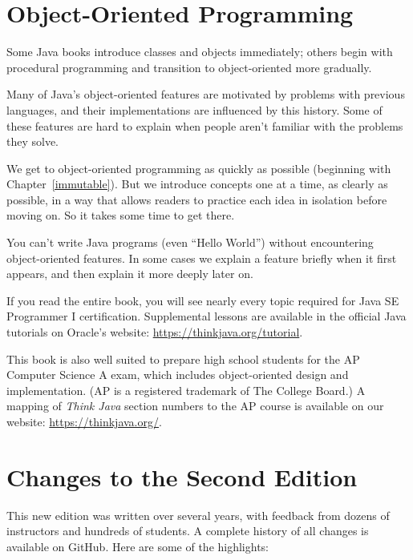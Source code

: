 \section*{Object-Oriented Programming}

Some Java books introduce classes and objects immediately; others begin with procedural programming and transition to object-oriented more gradually.

Many of Java's object-oriented features are motivated by problems with previous languages, and their implementations are influenced by this history.
Some of these features are hard to explain when people aren't familiar with the problems they solve.

We get to object-oriented programming as quickly as possible (beginning with Chapter~\ref{immutable}).
But we introduce concepts one at a time, as clearly as possible, in a way that allows readers to practice each idea in isolation before moving on.
So it takes some time to get there.

You can't write Java programs (even ``Hello World'') without encountering object-oriented features.
In some cases we explain a feature briefly when it first appears, and then explain it more deeply later on.

If you read the entire book, you will see nearly every topic required for Java SE Programmer I certification.
Supplemental lessons are available in the official Java tutorials on Oracle's website: \url{https://thinkjava.org/tutorial}.

This book is also well suited to prepare high school students for the AP Computer Science A exam, which includes object-oriented design and implementation.
(AP is a registered trademark of The College Board.)
A mapping of {\it Think Java} section numbers to the AP course is available on our website: \url{https://thinkjava.org/}.


\section*{Changes to the Second Edition}

This new edition was written over several years, with feedback from dozens of instructors and hundreds of students.
A complete history of all changes is available on GitHub.
Here are some of the highlights:

